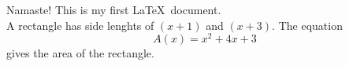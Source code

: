 \documentclass[11pt]{article}
\begin{document}
 Namaste! This is my first \LaTeX\ document.\\
 A rectangle has side lenghts of $(x+1)$ and $(x+3)$.
 The equation $${A(x)=x^2+4x+3}$$ gives the area of the rectangle.
 
\end{document}
